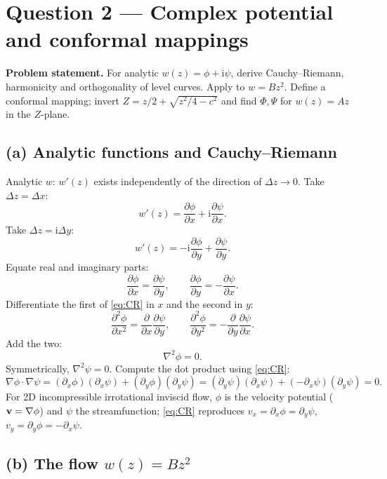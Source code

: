 \documentclass[11pt]{article}
\newcommand{\pd}[2]{\frac{\partial #1}{\partial #2}}
\newcommand{\pdd}[2]{\frac{\partial^{2} #1}{\partial #2^{2}}}
\newcommand{\Lap}{\nabla^{2}}
\begin{document}
\section*{Question 2 --- Complex potential and conformal mappings}

\textbf{Problem statement.} For analytic $w(z)=\phi+\mathrm{i}\psi$, derive Cauchy--Riemann, harmonicity and orthogonality of level curves. Apply to $w=Bz^2$. Define a conformal mapping; invert $Z = z/2 + \sqrt{z^2/4-c^2}$ and find $\Phi,\Psi$ for $w(z)=Az$ in the $Z$-plane.

\subsection*{(a) Analytic functions and Cauchy--Riemann}

Analytic $w$: $w'(z)$ exists independently of the direction of $\Delta z\to 0$. Take $\Delta z=\Delta x$:
\[ w'(z) = \pd{\phi}{x}+\mathrm{i}\pd{\psi}{x}. \]
Take $\Delta z=\mathrm{i}\Delta y$:
\[ w'(z) = -\mathrm{i}\pd{\phi}{y}+\pd{\psi}{y}. \]
Equate real and imaginary parts:
\begin{equation}
\boxed{\;\pd{\phi}{x}=\pd{\psi}{y},\qquad \pd{\phi}{y}=-\pd{\psi}{x}.\;}
\label{eq:CR}
\end{equation}
Differentiate the first of \eqref{eq:CR} in $x$ and the second in $y$:
\[ \pdd{\phi}{x} = \pd{}{x}\pd{\psi}{y},\qquad \pdd{\phi}{y} = -\pd{}{y}\pd{\psi}{x}. \]
Add the two:
\[ \Lap\phi = 0. \]
Symmetrically, $\Lap\psi = 0$. Compute the dot product using \eqref{eq:CR}:
\[ \nabla\phi\cdot\nabla\psi = (\partial_x\phi)(\partial_x\psi) + (\partial_y\phi)(\partial_y\psi) = (\partial_y\psi)(\partial_x\psi) + (-\partial_x\psi)(\partial_y\psi) = 0. \]
For 2D incompressible irrotational inviscid flow, $\phi$ is the velocity potential ($\vb v=\nabla\phi$) and $\psi$ the streamfunction; \eqref{eq:CR} reproduces $v_x=\partial_x\phi=\partial_y\psi$, $v_y=\partial_y\phi=-\partial_x\psi$.

\subsection*{(b) The flow $w(z)=Bz^2$}
\end{document}
